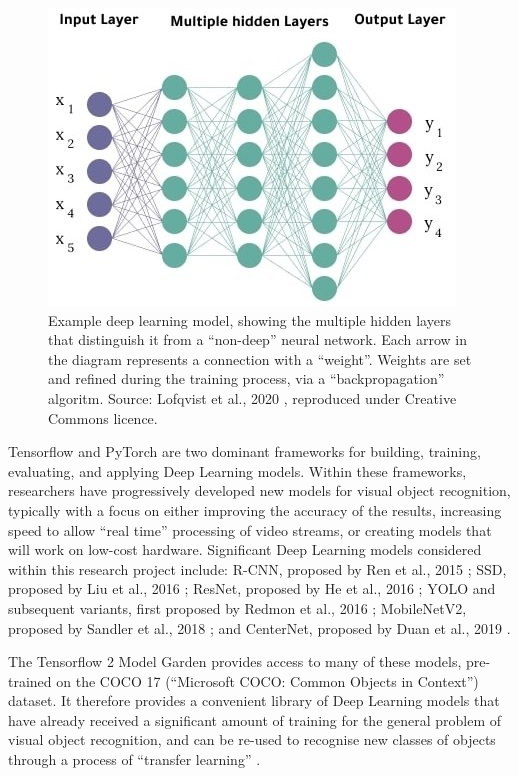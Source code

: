 \documentclass[11pt,twoside]{report}
\begin{document}
\begin{figure}[h]
\centering
\includegraphics[scale=0.60]{Deep-Neural-Network-with-multiple-hidden-layers.jpg}
\caption{Example deep learning model, showing the multiple hidden layers that distinguish it from a ``non-deep'' neural network.  Each arrow in the diagram represents a connection with a ``weight''.  Weights are set and refined during the training process, via a ``backpropagation'' algoritm.  Source: Lofqvist et al., 2020 \cite{diagram}, reproduced under Creative Commons licence.}
\label{fig:deep_learning_diag}
\end{figure}


Tensorflow \cite{TENSORFLOW2016A} \cite{TENSORFLOW2016B} and PyTorch \cite{pytorch} are two dominant frameworks for building, training, evaluating, and applying Deep Learning models.  Within these frameworks, researchers have progressively developed new models for visual object recognition, typically with a focus on either improving the accuracy of the results, increasing speed to allow ``real time'' processing of video streams, or creating models that will work on low-cost hardware.  Significant Deep Learning models considered within this research project include: R-CNN, proposed by Ren et al., 2015 \cite{REN2016}; SSD, proposed by Liu et al., 2016 \cite{ssd}; ResNet, proposed by He et al., 2016 \cite{He_2016_CVPR}; YOLO and subsequent variants, first proposed by Redmon et al., 2016 \cite{YOLOv1}; MobileNetV2, proposed by Sandler et al., 2018 \cite{MobileNetV2}; and CenterNet, proposed by Duan et al., 2019 \cite{centernet}.

The Tensorflow 2 Model Garden \cite{zoo} provides access to many of these models, pre-trained on the COCO 17 (``Microsoft COCO: Common Objects in Context'') dataset.  It therefore provides a convenient library of Deep Learning models that have already received a significant amount of training for the general problem of visual object recognition, and can be re-used to recognise new classes of objects through a process of ``transfer learning'' \cite{coco} \cite{transferlearning}.
\end{document}

